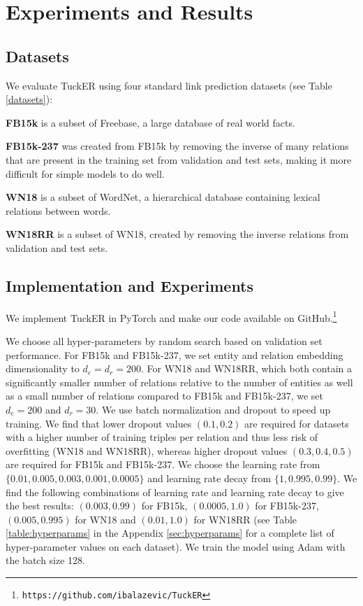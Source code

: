\documentclass[11pt,a4paper]{article}
\begin{document}
\vspace{-0.4cm}
\section{Experiments and Results}

\subsection{Datasets}

We evaluate TuckER using four standard link prediction datasets (see Table \ref{datasets}):

\noindent\textbf{FB15k}  \cite{bordes2013translating} is a subset of Freebase, a large database of real world facts.

\noindent\textbf{FB15k-237} \cite{toutanova2015representing} was created from FB15k by removing the inverse of many relations that are present in the training set from validation and test sets, making it more difficult for simple models to do well.

\noindent\textbf{WN18}  \cite{bordes2013translating} is a subset of WordNet, a hierarchical database containing lexical relations between words.

\noindent\textbf{WN18RR} \cite{dettmers2018convolutional} is a subset of WN18, created by removing the inverse relations from validation and test sets. 
 
\subsection{Implementation and Experiments}
We implement TuckER in PyTorch \cite{paszke2017automatic} and make our code available on GitHub.\footnote{\texttt{https://github.com/ibalazevic/TuckER}}

We choose all hyper-parameters by random search based on validation set performance. For FB15k and FB15k-237, we set entity and relation embedding dimensionality to $d_e= d_r = 200$. For WN18 and WN18RR, which both contain a significantly smaller number of relations relative to the number of entities as well as a small number of relations compared to FB15k and FB15k-237, we set $d_e=200$ and $d_r=30$.  We use batch normalization \cite{ioffe2015batch} and dropout \cite{srivastava2014dropout} to speed up training. We find that lower dropout values $(0.1, 0.2)$ are required for datasets with a higher number of training triples per relation and thus less risk of overfitting (WN18 and WN18RR), whereas higher dropout values $(0.3, 0.4, 0.5)$ are required for FB15k and FB15k-237. We choose the learning rate from $\{0.01, 0.005, 0.003, 0.001, 0.0005\}$ and learning rate decay from $\{1, 0.995, 0.99\}$. We find the following combinations of learning rate and learning rate decay to give the best results:  $(0.003, 0.99)$ for FB15k, $(0.0005, 1.0)$ for FB15k-237, $(0.005, 0.995)$ for WN18 and $(0.01, 1.0)$ for WN18RR (see Table \ref{table:hyperparams} in the Appendix \ref{sec:hyperparams} for a complete list of hyper-parameter values on each dataset). We train the model using Adam \cite{kingma2014adam} with the batch size 128.
\end{document}
